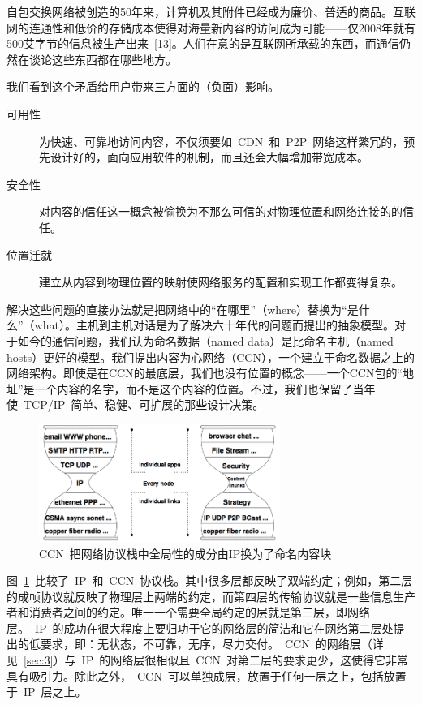 自包交换网络被创造的50年来，计算机及其附件已经成为廉价、普适的商品。互联网的连通性和低价的存储成本使得对海量新内容的访问成为可能——仅2008年就有500艾字节的信息被生产出来~[13]。人们在意的是互联网所承载的东西，而通信仍然在谈论这些东西都在哪些地方。

我们看到这个矛盾给用户带来三方面的（负面）影响。

\begin{description}
\item[可用性]为快速、可靠地访问内容，不仅须要如~CDN~和~P2P~网络这样繁冗的，预先设计好的，面向应用软件的机制，而且还会大幅增加带宽成本。
\item[安全性]对内容的信任这一概念被偷换为不那么可信的对物理位置和网络连接的的信任。
\item[位置迁就]建立从内容到物理位置的映射使网络服务的配置和实现工作都变得复杂。
\end{description}

解决这些问题的直接办法就是把网络中的“在哪里”（where）替换为“是什么”（what）。主机到主机对话是为了解决六十年代的问题而提出的抽象模型。对于如今的通信问题，我们认为命名数据（named data）是比命名主机（named hosts）更好的模型。我们提出内容为心网络（CCN），一个建立于命名数据之上的网络架构。即使是在CCN的最底层，我们也没有位置的概念——一个CCN包的“地址”是一个内容的名字，而不是这个内容的位置。不过，我们也保留了当年使~TCP/IP~简单、稳健、可扩展的那些设计决策。

\begin{figure}[htbp]
  \centering
  \includegraphics[width=0.7\textwidth]{images/narrow_waist}
  \caption{CCN~把网络协议栈中全局性的成分由IP换为了命名内容块} %
  \label{narrow_waist}
\end{figure}

图~\ref{narrow_waist}~比较了~IP~和~CCN~协议栈。其中很多层都反映了双端约定；例如，第二层的成帧协议就反映了物理层上两端的约定，而第四层的传输协议就是一些信息生产者和消费者之间的约定。唯一一个需要全局约定的层就是第三层，即网络层。~IP~的成功在很大程度上要归功于它的网络层的简洁和它在网络第二层处提出的低要求，即：无状态，不可靠，无序，尽力交付。~CCN~的网络层（详见~\ref{sec:3}）与~IP~的网络层很相似且~CCN~对第二层的要求更少，这使得它非常具有吸引力。除此之外，~CCN~可以单独成层，放置于任何一层之上，包括放置于~IP~层之上。%


